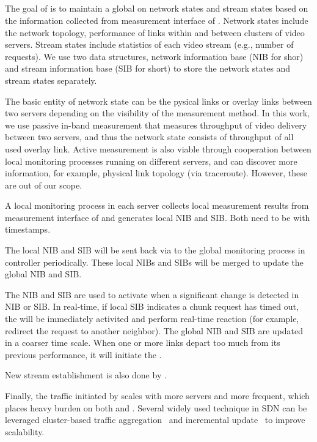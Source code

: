 \subsection{\Discovery}

The goal of \discovery is to maintain a global on network states and stream states based on the information collected from measurement interface of \data. Network states include the network topology, performance of links within and between clusters of video servers.  Stream states include statistics of each video stream  (e.g., number of requests). We use two data structures, network information base (NIB for shor) and stream information base (SIB for short) to store the network states and stream states separately.

The basic entity of network state can be the pysical links or overlay links between two servers depending on the visibility of the measurement method. In this work, we use passive in-band measurement that measures throughput of video delivery between two servers, and thus the network state consists of throughput of all used overlay link.  Active measurement is also viable through cooperation between local monitoring processes running on different servers, and can discover more information, for example, physical link topology (via traceroute). However, these are out of our scope. 

A local monitoring process in each server collects local measurement results from measurement interface of \data and generates local NIB and SIB. Both need to be with timestamps. 

The local NIB and SIB will be sent back via \dissemination to the global monitoring process in controller periodically. These local NIBs and SIBs will be merged to update the global NIB and SIB.

The NIB and SIB are used to activate \decision when a significant change is detected in NIB or SIB. In real-time, if local SIB indicates a chunk request has timed out, the \localControl will be immediately activited and perform real-time reaction (for example, redirect the request to another neighbor). The global NIB and SIB are updated in a coarser time scale. When one or more links depart too much from its previous performance, it will initiate the \globalControl.

New stream establishment is also done by \discovery.

Finally, the traffic initiated by \discovery scales with more servers and more frequent, which places heavy burden on both \dissemination and \decision. Several widely used technique in SDN can be leveraged cluster-based traffic aggregation~\cite{?} and incremental update~\cite{?} to improve scalability.



